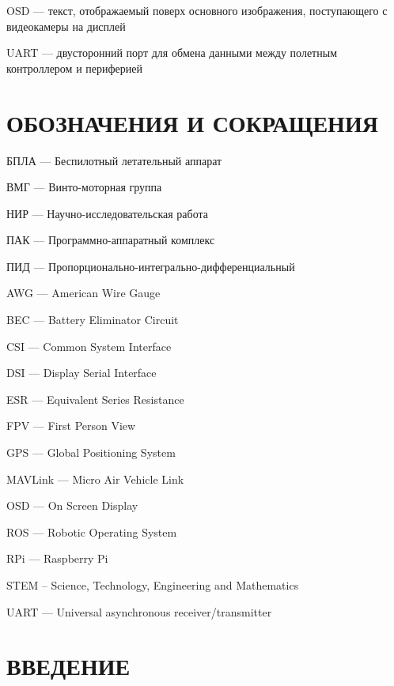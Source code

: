 \documentclass[a4paper,12pt]{article}
\begin{document}
OSD --- текст, отображаемый поверх основного изображения, поступающего с видеокамеры на дисплей

UART --- двусторонний порт для обмена данными между полетным контроллером и периферией

\pagebreak
\thispagestyle{empty}

\section*{\centering ОБОЗНАЧЕНИЯ И СОКРАЩЕНИЯ}

БПЛА --- Беспилотный летательный аппарат

ВМГ --- Винто-моторная группа

НИР --- Научно-исследовательская работа

ПАК --- Программно-аппаратный комплекс

ПИД --- Пропорционально-интегрально-дифференциальный

AWG --- American Wire Gauge

BEC --- Battery Eliminator Circuit

CSI --- Common System Interface

DSI --- Display Serial Interface

ESR --- Equivalent Series Resistance

FPV --- First Person View

GPS --- Global Positioning System

MAVLink --- Micro Air Vehicle Link

OSD --- On Screen Display

ROS --- Robotic Operating System

RPi --- Raspberry Pi

STEM -- Science, Technology, Engineering and Mathematics

UART --- Universal asynchronous receiver/transmitter


\pagebreak
{}
\tableofcontents

\thispagestyle{empty} %
\pagebreak

\setcounter{page}{3}
\section*{\centering ВВЕДЕНИЕ}
\pagebreak
\pagebreak
\pagebreak
\pagebreak
\pagebreak
\pagebreak
\end{document}
